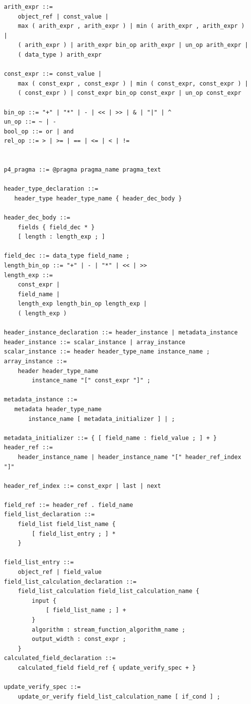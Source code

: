 \documentclass[12pt]{article}
\begin{document}
\begin{lstlisting}[style=BNFstyle]
arith_expr ::=
    object_ref | const_value | 
    max ( arith_expr , arith_expr ) | min ( arith_expr , arith_expr ) |
    ( arith_expr ) | arith_expr bin_op arith_expr | un_op arith_expr |
    ( data_type ) arith_expr

const_expr ::= const_value |
    max ( const_expr , const_expr ) | min ( const_expr, const_expr ) |
    ( const_expr ) | const_expr bin_op const_expr | un_op const_expr 

bin_op ::= "+" | "*" | - | << | >> | & | "|" | ^
un_op ::= ~ | -
bool_op ::= or | and
rel_op ::= > | >= | == | <= | < | !=


p4_pragma ::= @pragma pragma_name pragma_text

header_type_declaration ::= 
   header_type header_type_name { header_dec_body }

header_dec_body ::=
    fields { field_dec * }
    [ length : length_exp ; ]

field_dec ::= data_type field_name ;
length_bin_op ::= "+" | - | "*" | << | >>
length_exp ::=
    const_expr |
    field_name |
    length_exp length_bin_op length_exp |
    ( length_exp )

header_instance_declaration ::= header_instance | metadata_instance
header_instance ::= scalar_instance | array_instance
scalar_instance ::= header header_type_name instance_name ;
array_instance ::=
    header header_type_name 
        instance_name "[" const_expr "]" ;

metadata_instance ::= 
   metadata header_type_name
       instance_name [ metadata_initializer ] | ;

metadata_initializer ::= { [ field_name : field_value ; ] + }
header_ref ::=
    header_instance_name | header_instance_name "[" header_ref_index "]"

header_ref_index ::= const_expr | last | next

field_ref ::= header_ref . field_name
field_list_declaration ::=
    field_list field_list_name {
        [ field_list_entry ; ] *
    }

field_list_entry ::= 
    object_ref | field_value
field_list_calculation_declaration ::=
    field_list_calculation field_list_calculation_name {
        input {
            [ field_list_name ; ] +
        }
        algorithm : stream_function_algorithm_name ;
        output_width : const_expr ;
    }
calculated_field_declaration ::=
    calculated_field field_ref { update_verify_spec + }

update_verify_spec ::=
    update_or_verify field_list_calculation_name [ if_cond ] ;


\end{lstlisting}
\end{document}
